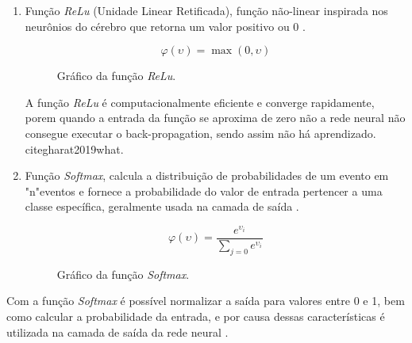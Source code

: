 \begin{enumerate}
	\item Função \textit{ReLu} (Unidade Linear Retificada), função não-linear inspirada nos neurônios do cérebro que retorna um valor positivo ou 0 \cite{rizzo2020inteligencia}.
	\begin{figure}[H]
	\caption{Gráfico da função \textit{ReLu}.}
	\begin{center}
		\begin{minipage}{0.45\textwidth}
			$$\varphi(\upsilon) = \max(0,\upsilon)$$
		\end{minipage}
		\hfill
		\begin{minipage}{0.45\textwidth}
		\end{minipage}
	\end{center}
	\label{fig:grafico_relu}
	\end{figure}
	A função \textit{ReLu} é computacionalmente eficiente e converge rapidamente, porem quando a entrada da função se aproxima de zero não a rede neural não consegue executar o back-propagation, sendo assim não há aprendizado. cite{gharat2019what}.

	\item Função \textit{Softmax}, calcula a distribuição de probabilidades de um evento em "n"\space eventos e fornece a probabilidade do valor de entrada pertencer a uma classe específica, geralmente usada na camada de saída \cite{gharat2019what}.
	\begin{figure}[H]
	\caption{Gráfico da função \textit{Softmax}.}
	\begin{center}
		\begin{minipage}{0.45\textwidth}
			$$\varphi(\upsilon) = \frac{e^{\upsilon_i}}{\sum_{j=0} e^{\upsilon_i}}$$
		\end{minipage}
		\hfill
		\begin{minipage}{0.45\textwidth}
		\end{minipage}
	\end{center}
	\label{fig:grafico_softmax}
	\end{figure}
\end{enumerate}

Com a função \textit{Softmax} é possível normalizar a saída para valores entre 0 e 1, bem como calcular a probabilidade da entrada, e por causa dessas características é utilizada na camada de saída da rede neural \cite{gharat2019what}.
